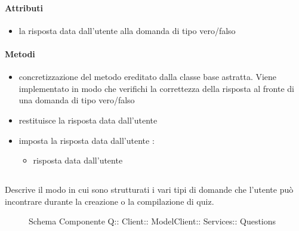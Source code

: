 \paragraph{Attributi}
\begin{itemize}
\item {}
\newline
la risposta data dall'utente alla domanda di tipo vero/falso
\end{itemize}
\paragraph{Metodi}
\begin{itemize}
\item {}
\newline
concretizzazione del metodo ereditato dalla classe base astratta. Viene implementato in modo che verifichi la correttezza della risposta al fronte di una domanda di tipo vero/falso
\newline
\item {}
\newline
restituisce la risposta data dall'utente
\newline
\item {}
\newline
imposta la risposta data dall'utente
\newline
{} :
\begin{itemize}
\item {}
\newline
risposta data dall'utente
\end{itemize}
\end{itemize}
\subsection{}
Descrive il modo in cui sono strutturati i vari tipi di domande che l'utente può incontrare durante la creazione o la compilazione di quiz.
\begin{figure}[H]
\centering
\noindent{}
\caption[Schema Componente Quizzipedia::Client::ModelClient::Services::Questions]{Schema Componente Q:: Client:: ModelClient:: Services:: Questions}
\end{figure}
